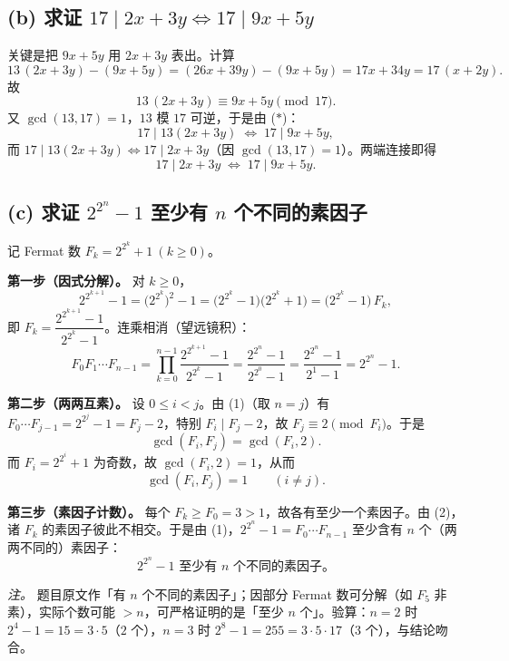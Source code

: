 \documentclass{article}
\begin{document}
\subsection*{(b) 求证 $17\mid 2x+3y\iff 17\mid 9x+5y$}

\begin{solution}
关键是把 $9x+5y$ 用 $2x+3y$ 表出。计算
\[
  13\,(2x+3y)-(9x+5y)=(26x+39y)-(9x+5y)=17x+34y=17\,(x+2y).
\]
故
\[
  13\,(2x+3y)\equiv 9x+5y\pmod{17}. \tag{$*$}
\]
又 $\gcd(13,17)=1$，$13$ 模 $17$ 可逆，于是由 ($*$)：
\[
  17\mid 13(2x+3y)\;\iff\;17\mid 9x+5y,
\]
而 $17\mid 13(2x+3y)\iff 17\mid 2x+3y$（因 $\gcd(13,17)=1$）。两端连接即得
\[
  \boxed{17\mid 2x+3y\;\iff\;17\mid 9x+5y.}
\]
\end{solution}

\subsection*{(c) 求证 $2^{2^{n}}-1$ 至少有 $n$ 个不同的素因子}

\begin{solution}
记 Fermat 数 $F_k=2^{2^{k}}+1\ (k\ge 0)$。

\medskip\noindent\textbf{第一步（因式分解）。} 对 $k\ge 0$，
\[
  2^{2^{k+1}}-1=\bigl(2^{2^{k}}\bigr)^{2}-1=\bigl(2^{2^{k}}-1\bigr)\bigl(2^{2^{k}}+1\bigr)=\bigl(2^{2^{k}}-1\bigr)\,F_k,
\]
即 $F_k=\dfrac{2^{2^{k+1}}-1}{2^{2^{k}}-1}$。连乘相消（望远镜积）：
\[
  F_0 F_1\cdots F_{n-1}
  =\prod_{k=0}^{n-1}\frac{2^{2^{k+1}}-1}{2^{2^{k}}-1}
  =\frac{2^{2^{n}}-1}{2^{2^{0}}-1}
  =\frac{2^{2^{n}}-1}{2^{1}-1}
  =2^{2^{n}}-1. \tag{1}
\]

\medskip\noindent\textbf{第二步（两两互素）。} 设 $0\le i<j$。由 (1)（取 $n=j$）有 $F_0\cdots F_{j-1}=2^{2^{j}}-1=F_j-2$，特别 $F_i\mid F_j-2$，故 $F_j\equiv 2\pmod{F_i}$。于是
\[
  \gcd(F_i,F_j)=\gcd(F_i,2).
\]
而 $F_i=2^{2^{i}}+1$ 为奇数，故 $\gcd(F_i,2)=1$，从而
\[
  \gcd(F_i,F_j)=1\qquad(i\ne j). \tag{2}
\]

\medskip\noindent\textbf{第三步（素因子计数）。} 每个 $F_k\ge F_0=3>1$，故各有至少一个素因子。由 (2)，诸 $F_k$ 的素因子彼此不相交。于是由 (1)，$2^{2^{n}}-1=F_0\cdots F_{n-1}$ 至少含有 $n$ 个（两两不同的）素因子：
\[
  \boxed{2^{2^{n}}-1\text{ 至少有 }n\text{ 个不同的素因子。}}
\]

\smallskip\noindent\textit{注。} 题目原文作「有 $n$ 个不同的素因子」；因部分 Fermat 数可分解（如 $F_5$ 非素），实际个数可能 $>n$，可严格证明的是「至少 $n$ 个」。验算：$n=2$ 时 $2^{4}-1=15=3\cdot5$（$2$ 个），$n=3$ 时 $2^{8}-1=255=3\cdot5\cdot17$（$3$ 个），与结论吻合。
\end{solution}
\end{document}

